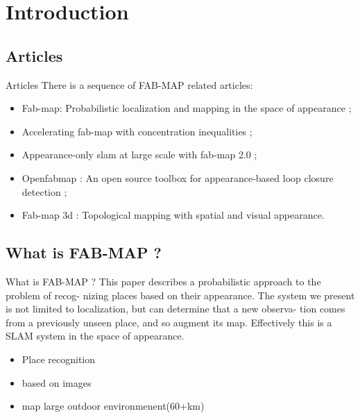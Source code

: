 \section{Introduction}

\subsection{Articles}
\begin{frame}{Articles}
    There is a sequence of FAB-MAP related articles:
    \begin{itemize}
        \item Fab-map: Probabilistic localization and mapping in the space of appearance\cite{fabmap2008} ;
        \item Accelerating fab-map with concentration inequalities\cite{accelerating} ;
        \item Appearance-only slam at large scale with fab-map 2.0\cite{fabmap2011} ;
        \item Openfabmap : An open source toolbox for appearance-based loop closure detection\cite{openfabmap} ;
        \item Fab-map 3d : Topological mapping with spatial and visual appearance\cite{fabmap3d}.
    \end{itemize}
\end{frame}

\subsection{What is FAB-MAP ?}
\begin{frame}{What is FAB-MAP ?}
    This paper describes a probabilistic approach to the problem of recog- nizing places based on their appearance. The system we present is not limited to localization, but can determine that a new observa- tion comes from a previously unseen place, and so augment its map. Effectively this is a SLAM system in the space of appearance.
    \begin{itemize}
        \item Place recognition
        \item based on images
        \item map large outdoor environmenent(60+km)
    \end{itemize}
\end{frame}

